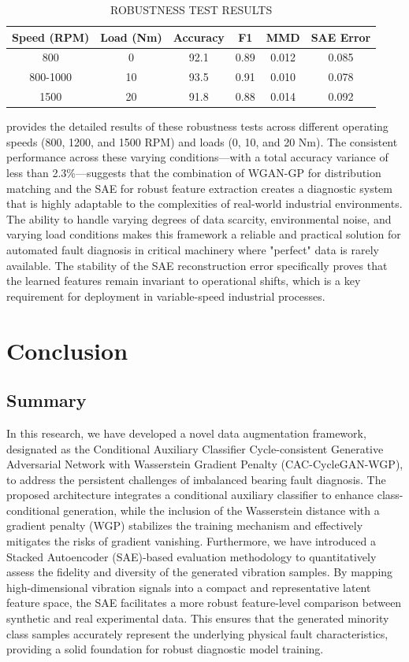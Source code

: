 \documentclass[twocolumn]{IEEEtran}
\begin{document}
\begin{table}[htbp]
\centering
\caption{ROBUSTNESS TEST RESULTS}
\label{tab:robustness}
\begin{tabular}{cccccc}
\hline
Speed (RPM) & Load (Nm) & Accuracy & F1 & MMD & SAE Error \\
\hline
800 & 0 & 92.1 & 0.89 & 0.012 & 0.085 \\
800-1000 & 10 & 93.5 & 0.91 & 0.010 & 0.078 \\
1500 & 20 & 91.8 & 0.88 & 0.014 & 0.092 \\
\hline
\end{tabular}
\end{table} provides the detailed results of these robustness tests across different operating speeds (800, 1200, and 1500 RPM) and loads (0, 10, and 20 Nm). The consistent performance across these varying conditions—with a total accuracy variance of less than 2.3\%—suggests that the combination of WGAN-GP for distribution matching and the SAE for robust feature extraction creates a diagnostic system that is highly adaptable to the complexities of real-world industrial environments. The ability to handle varying degrees of data scarcity, environmental noise, and varying load conditions makes this framework a reliable and practical solution for automated fault diagnosis in critical machinery where "perfect" data is rarely available. The stability of the SAE reconstruction error specifically proves that the learned features remain invariant to operational shifts, which is a key requirement for deployment in variable-speed industrial processes.


\section{Conclusion}
\label{sec:conclusion}

\subsection{Summary}
In this research, we have developed a novel data augmentation framework, designated as the Conditional Auxiliary Classifier Cycle-consistent Generative Adversarial Network with Wasserstein Gradient Penalty (CAC-CycleGAN-WGP), to address the persistent challenges of imbalanced bearing fault diagnosis. The proposed architecture integrates a conditional auxiliary classifier to enhance class-conditional generation, while the inclusion of the Wasserstein distance with a gradient penalty (WGP) stabilizes the training mechanism and effectively mitigates the risks of gradient vanishing. Furthermore, we have introduced a Stacked Autoencoder (SAE)-based evaluation methodology to quantitatively assess the fidelity and diversity of the generated vibration samples. By mapping high-dimensional vibration signals into a compact and representative latent feature space, the SAE facilitates a more robust feature-level comparison between synthetic and real experimental data. This ensures that the generated minority class samples accurately represent the underlying physical fault characteristics, providing a solid foundation for robust diagnostic model training.
\end{document}
